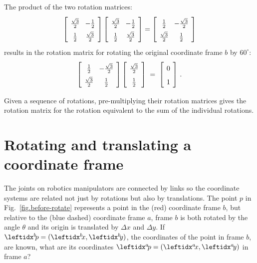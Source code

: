 The product of the two rotation matrices:
\[
\spacearray
\left[\begin{array}{cc}\frac{\sqrt{3}}{2}&-\frac{1}{2}\\\frac{1}{2}&\frac{\sqrt{3}}{2}\end{array}\right]
\left[\begin{array}{cc}\frac{\sqrt{3}}{2}&-\frac{1}{2}\\\frac{1}{2}&\frac{\sqrt{3}}{2}\end{array}\right]=
\left[\begin{array}{cc}\frac{1}{2}&-\frac{\sqrt{3}}{2}\\\frac{\sqrt{3}}{2}&\frac{1}{2}\end{array}\right]
\]
results in the rotation matrix for rotating the original coordinate frame $b$ by $60^{\circ}$:
\[
\spacearray
\left[\begin{array}{cc}\frac{1}{2}&-\frac{\sqrt{3}}{2}\\\frac{\sqrt{3}}{2}&\frac{1}{2}\end{array}\right]
\left[\begin{array}{c}\frac{\sqrt{3}}{2}\\\frac{1}{2}\end{array}\right]\;=\;
\left[\begin{array}{c}0\\1\end{array}\right]\,.
\]

Given a sequence of rotations, pre-multiplying their rotation matrices gives the rotation matrix for the rotation equivalent to the sum of the individual rotations.

\section{Rotating and translating a coordinate frame}\label{s.rotate-translate}

The joints on robotics manipulators are connected by links so the coordinate systems are related not just by rotations but also by translations. The point $p$ in Fig.~\ref{fig.before-rotate} represents a point in the (red) coordinate frame $b$, but relative to the (blue dashed) coordinate frame $a$, frame $b$ is both rotated by the angle $\theta$ and its origin is translated by $\Delta x$ and $\Delta y$. If $\bp=(\bx,\by)$, the coordinates of the point in frame $b$, are known, what are its coordinates $\ap=(\ax,\ay)$ in frame $a$?

